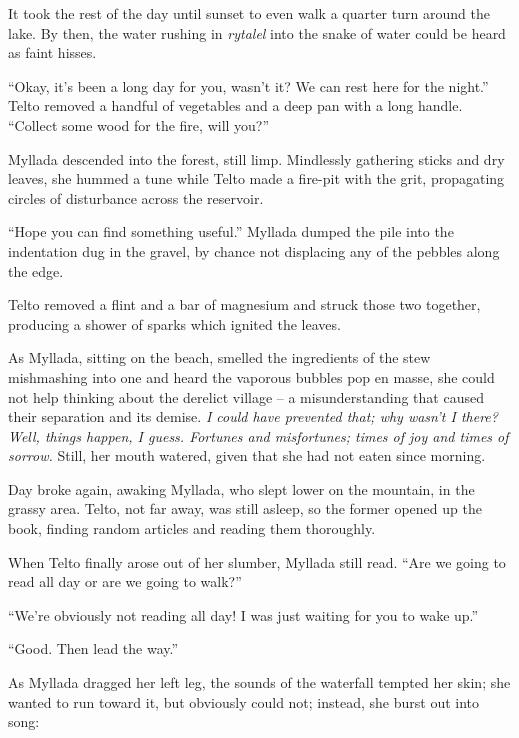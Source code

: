 It took the rest of the day until sunset to even walk a quarter turn around the lake. By then, the water rushing in \emph{rytalel} into the snake of water could be heard as faint hisses.

``Okay, it's been a long day for you, wasn't it? We can rest here for the night.'' Telto removed a handful of vegetables and a deep pan with a long handle. ``Collect some wood for the fire, will you?''

Myllada descended into the forest, still limp. Mindlessly gathering sticks and dry leaves, she hummed a tune while Telto made a fire-pit with the grit, propagating circles of disturbance across the reservoir.

``Hope you can find something useful.'' Myllada dumped the pile into the indentation dug in the gravel, by chance not displacing any of the pebbles along the edge.

Telto removed a flint and a bar of magnesium and struck those two together, producing a shower of sparks which ignited the leaves.

As Myllada, sitting on the beach, smelled the ingredients of the stew mishmashing into one and heard the vaporous bubbles pop en masse, she could not help thinking about the derelict village -- a misunderstanding that caused their separation and its demise. \emph{\emph{I} could have prevented that; why wasn't I there? Well, things happen, I guess. Fortunes and misfortunes; times of joy and times of sorrow.} Still, her mouth watered, given that she had not eaten since morning.

\centeredstars

Day broke again, awaking Myllada, who slept lower on the mountain, in the grassy area. Telto, not far away, was still asleep, so the former opened up the book, finding random articles and reading them thoroughly.

When Telto finally arose out of her slumber, Myllada still read. ``Are we going to read all day or are we going to walk?''

``We're obviously not reading all day! I was just waiting for you to wake up.''

``Good. Then lead the way.''

As Myllada dragged her left leg, the sounds of the waterfall tempted her skin; she wanted to run toward it, but obviously could not; instead, she burst out into song:

